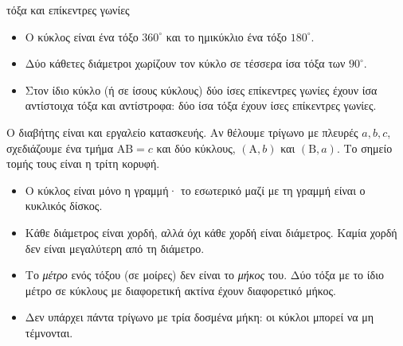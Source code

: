 \begin{center}
\end{center}

\begin{idiotita}{τόξα και επίκεντρες γωνίες}
\begin{itemize}[leftmargin=1.2em,itemsep=0.3ex,topsep=2pt]
\item Ο κύκλος είναι ένα τόξο $360^\circ$ και το ημικύκλιο ένα τόξο $180^\circ$.
\item Δύο κάθετες διάμετροι χωρίζουν τον κύκλο σε τέσσερα ίσα τόξα των $90^\circ$.
\item Στον ίδιο κύκλο (ή σε ίσους κύκλους) δύο ίσες επίκεντρες γωνίες έχουν ίσα αντίστοιχα τόξα και αντίστροφα: δύο ίσα τόξα έχουν ίσες επίκεντρες γωνίες.
\end{itemize}
\end{idiotita}

Ο διαβήτης είναι και εργαλείο κατασκευής. Αν θέλουμε τρίγωνο με πλευρές $a,b,c$, σχεδιάζουμε ένα τμήμα $\mathrm{ΑΒ}=c$ και δύο κύκλους, $(\mathrm{Α},b)$ και $(\mathrm{Β},a)$. Το σημείο τομής τους είναι η τρίτη κορυφή.

\begin{prosoxi}
\begin{itemize}[leftmargin=1.2em,itemsep=0.3ex,topsep=2pt]
\item Ο κύκλος είναι μόνο η γραμμή· το εσωτερικό μαζί με τη γραμμή είναι ο κυκλικός δίσκος.
\item Κάθε διάμετρος είναι χορδή, αλλά όχι κάθε χορδή είναι διάμετρος. Καμία χορδή δεν είναι μεγαλύτερη από τη διάμετρο.
\item Το \emph{μέτρο} ενός τόξου (σε μοίρες) δεν είναι το \emph{μήκος} του. Δύο τόξα με το ίδιο μέτρο σε κύκλους με διαφορετική ακτίνα έχουν διαφορετικό μήκος.
\item Δεν υπάρχει πάντα τρίγωνο με τρία δοσμένα μήκη: οι κύκλοι μπορεί να μη τέμνονται.
\end{itemize}
\end{prosoxi}

